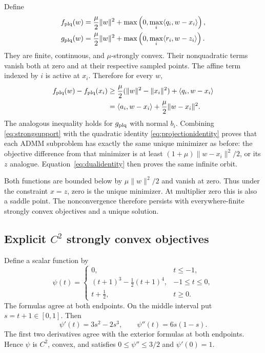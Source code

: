 \documentclass[11pt,a4paper]{article}
\theoremstyle{remark}
\newcommand{\ip}[2]{\langle #1,#2\rangle}
\newcommand{\norm}[1]{\lVert #1\rVert}
\begin{document}
Define
\begin{align}
f_{\rm plq}(w)&=\frac\mu2\norm{w}^2+
\max\left(0,\max_i\ip{q_i}{w-x_i}\right),\label{eq:plqf}\\
g_{\rm plq}(w)&=\frac\mu2\norm{w}^2+
\max\left(0,\max_i\ip{r_i}{w-z_i}\right).\label{eq:plqg}
\end{align}
They are finite, continuous, and $\mu$-strongly convex. Their nonquadratic terms vanish both at zero and at their respective sampled points. The affine term indexed by $i$ is active at $x_i$. Therefore for every $w$,
\begin{align}
f_{\rm plq}(w)-f_{\rm plq}(x_i)
&\ge \frac\mu2(\norm{w}^2-\norm{x_i}^2)+\ip{q_i}{w-x_i}\notag\\
&=\ip{a_i}{w-x_i}+\frac\mu2\norm{w-x_i}^2.\label{eq:strongsupport}
\end{align}
The analogous inequality holds for $g_{\rm plq}$ with normal $b_i$. Combining \eqref{eq:strongsupport} with the quadratic identity \eqref{eq:projectionidentity} proves that each ADMM subproblem has exactly the same unique minimizer as before: the objective difference from that minimizer is at least $(1+\mu)\norm{w-x_i}^2/2$, or its $z$ analogue. Equation~\eqref{eq:dualidentity} then proves the same infinite orbit.

Both functions are bounded below by $\mu\norm{w}^2/2$ and vanish at zero. Thus under the constraint $x=z$, zero is the unique minimizer. At multiplier zero this is also a saddle point. The nonconvergence therefore persists with everywhere-finite strongly convex objectives and a unique solution.

\subsection{Explicit \texorpdfstring{$C^2$}{C2} strongly convex objectives}
Define a scalar function by
\begin{equation}\label{eq:psi}
\psi(t)=\begin{cases}
0,&t\le-1,\\
(t+1)^3-\tfrac12(t+1)^4,&-1\le t\le0,\\
t+\tfrac12,&t\ge0.
\end{cases}
\end{equation}
The formulas agree at both endpoints. On the middle interval put $s=t+1\in[0,1]$. Then
\[
\psi'(t)=3s^2-2s^3,\qquad
\psi''(t)=6s(1-s).
\]
The first two derivatives agree with the exterior formulas at both endpoints. Hence $\psi$ is $C^2$, convex, and satisfies $0\le\psi''\le3/2$ and $\psi'(0)=1$.
\end{document}
